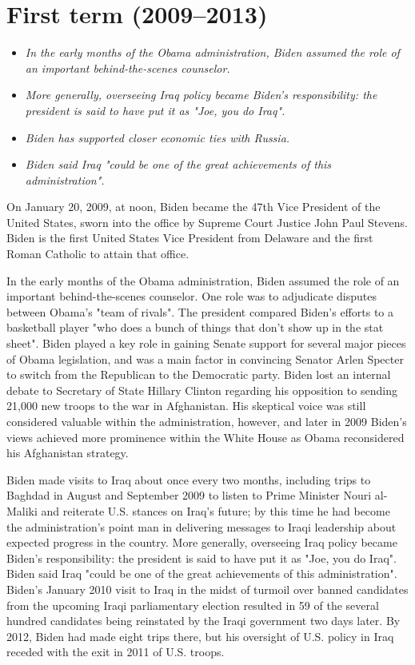 \section{First term (2009--2013)}\label{first-term-20092013}

\begin{itemize}
\item
  \emph{In the early months of the Obama administration, Biden assumed
  the role of an important behind-the-scenes counselor.}
\item
  \emph{More generally, overseeing Iraq policy became Biden's
  responsibility: the president is said to have put it as "Joe, you do
  Iraq".}
\item
  \emph{Biden has supported closer economic ties with Russia.}
\item
  \emph{Biden said Iraq "could be one of the great achievements of this
  administration".}
\end{itemize}

On January 20, 2009, at noon, Biden became the 47th Vice President of
the United States, sworn into the office by Supreme Court Justice John
Paul Stevens. Biden is the first United States Vice President from
Delaware and the first Roman Catholic to attain that office.

In the early months of the Obama administration, Biden assumed the role
of an important behind-the-scenes counselor. One role was to adjudicate
disputes between Obama's "team of rivals". The president compared
Biden's efforts to a basketball player "who does a bunch of things that
don't show up in the stat sheet". Biden played a key role in gaining
Senate support for several major pieces of Obama legislation, and was a
main factor in convincing Senator Arlen Specter to switch from the
Republican to the Democratic party. Biden lost an internal debate to
Secretary of State Hillary Clinton regarding his opposition to sending
21,000 new troops to the war in Afghanistan. His skeptical voice was
still considered valuable within the administration, however, and later
in 2009 Biden's views achieved more prominence within the White House as
Obama reconsidered his Afghanistan strategy.

Biden made visits to Iraq about once every two months, including trips
to Baghdad in August and September 2009 to listen to Prime Minister
Nouri al-Maliki and reiterate U.S. stances on Iraq's future; by this
time he had become the administration's point man in delivering messages
to Iraqi leadership about expected progress in the country. More
generally, overseeing Iraq policy became Biden's responsibility: the
president is said to have put it as "Joe, you do Iraq". Biden said Iraq
"could be one of the great achievements of this administration". Biden's
January 2010 visit to Iraq in the midst of turmoil over banned
candidates from the upcoming Iraqi parliamentary election resulted in 59
of the several hundred candidates being reinstated by the Iraqi
government two days later. By 2012, Biden had made eight trips there,
but his oversight of U.S. policy in Iraq receded with the exit in 2011
of U.S. troops.

